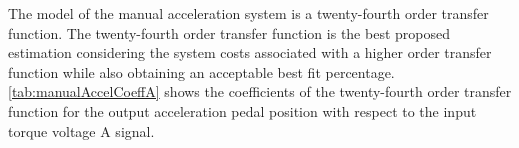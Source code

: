 \documentclass[letterpaper,12pt]{article}   %
\begin{document}
\vspace{12pt}
\noindent The model of the manual acceleration system is a twenty-fourth order transfer function. The twenty-fourth order transfer function is the best proposed estimation considering the system costs associated with a higher order transfer function while also obtaining an acceptable best fit percentage. \autoref{tab:manualAccelCoeffA} shows the coefficients of the twenty-fourth order transfer function for the output acceleration pedal position with respect to the input torque voltage A signal. %
%
\begin{table}[hbtp]
	\caption{Manual Mode Acceleration Transfer Function Torque Voltage A Coefficient Table}
	\label{tab:manualAccelCoeffA}
  \centering
    \begin{center}
    \end{center}
\end{table}
%
\end{document}
